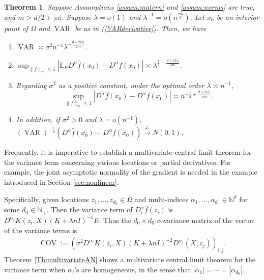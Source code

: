 \documentclass[12pt]{article}
\theoremstyle{plain}
\newtheorem{theorem}{Theorem}
\theoremstyle{remark}
\begin{document}
\begin{theorem}\label{Th:derivative}
    Suppose Assumptions \ref{assum:matern} and \ref{assum:norms} are true, and $m>d/2+|\alpha|$. Suppose $\lambda=o(1)$ and $\lambda^{-1}=o(n^{\frac{2m}{d}})$. Let $x_0$ be an interior point of $\Omega$ and $\operatorname{VAR}$ be as in (\ref{VARderivative}). Then, we have
    \begin{enumerate}
        \item $\operatorname{VAR}\asymp \sigma^2 n^{-1}\lambda^{-\frac{d+2|\alpha|}{2m}}$.
        \item $\sup_{\|f\|_\mathcal{H}\leq 1}\left|\mathbb{E}_E D^\alpha \hat{f}(x_0)-D^\alpha f(x_0)\right| \asymp \lambda^{\frac{1}{2}-\frac{d+2|\alpha|}{4m}}$.
        \item Regarding $\sigma^2$ as a positive constant, under the optimal order $\lambda\asymp n^{-1}$, 
        \[\sup_{\|f\|_\mathcal{H}\leq 1}|D^\alpha \hat{f}(x_0)-D^\alpha f(x_0)|\asymp n^{-\frac{1}{2}+\frac{d+2|\alpha|}{4m}}.\]
        \item In addition, if $\sigma^2>0$ and $\lambda=o(n^{-1})$, $(\operatorname{VAR})^{-\frac{1}{2}}(D^\alpha \hat{f}(x_0)-D^\alpha f(x_0))\xrightarrow{\mathscr{L}}N(0,1)$.
    \end{enumerate}
\end{theorem}

Frequently, it is imperative to establish a multivariate central limit theorem for the variance term concerning various locations or partial derivatives. For example, the joint asymptotic normality of the gradient is needed in the example introduced in Section \ref{sec:nonlinear}.

Specifically, given locations $z_1,\ldots,z_{d_0}\in\Omega$ and multi-indices $\alpha_1,\ldots,\alpha_{d_0}\in \mathbb{N}^d$ for some $d_0\in\mathbb{N}_+$. Then the variance term of $D^\alpha_i \hat{f}(z_i)$ is
$D^{\alpha_i} K(z_i,X)(K+\lambda n I)^{-1}E$.
Thus the $d_0\times d_0$ covariance matrix of the vector of the variance terms is
\begin{eqnarray}\label{cov}
    \operatorname{COV}:=\left(\sigma^2D^{\alpha_i} K(z_i,X)(K+\lambda n I)^{-2}D^{\alpha_j}(X,z_j)\right)_{i,j}.
\end{eqnarray}
Theorem \ref{Th:multivariateAN} shows a multivariate central limit theorem for the variance term when $\alpha_i$'s are homogeneous, in the sense that $|\alpha_1|=\cdots=|\alpha_{d_0}|$.
\end{document}
